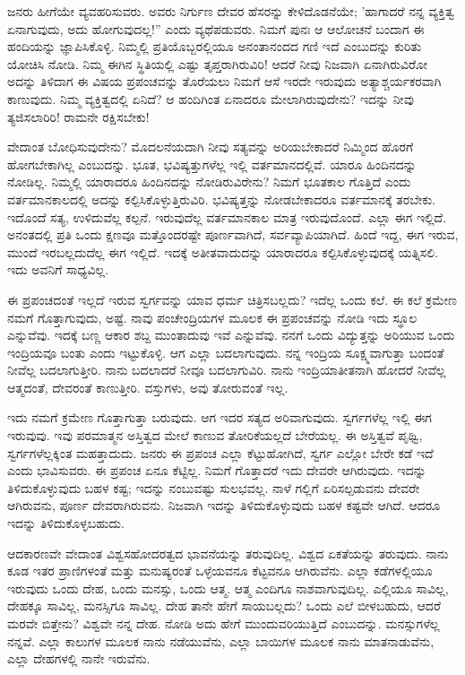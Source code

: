ಜನರು ಹೀಗೆಯೇ ವ್ಯವಹರಿಸುವರು. ಅವರು ನಿರ್ಗುಣ ದೇವರ ಹೆಸರನ್ನು ಕೇಳಿದೊಡನೆಯೇ; 'ಹಾಗಾದರೆ ನನ್ನ ವ್ಯಕ್ತಿತ್ವ ಏನಾಗುವುದು, ಅದು ಹೋಗುವುದಲ್ಲ!'' ಎಂದು ವ್ಯಥೆಪಡುವರು. ನಿಮಗೆ ಪುನಃ ಆ ಆಲೋಚನೆ ಬಂದಾಗ ಈ ಹಂದಿಯನ್ನು ಜ್ಞಾಪಿಸಿಕೊಳ್ಳಿ. ನಿಮ್ಮಲ್ಲಿ ಪ್ರತಿಯೊಬ್ಬರಲ್ಲಿಯೂ ಅನಂತಾನಂದದ ಗಣಿ ಇದೆ ಎಂಬುದನ್ನು ಕುರಿತು ಯೋಚಿಸಿ ನೋಡಿ. ನಿಮ್ಮ ಈಗಿನ ಸ್ಥಿತಿಯಲ್ಲಿ ಎಷ್ಟು ತೃಪ್ತರಾಗಿರುವಿರಿ! ಆದರೆ ನೀವು ನಿಜವಾಗಿ ಏನಾಗಿರುವಿರೋ ಅದನ್ನು ತಿಳಿದಾಗ ಈ ವಿಷಯ ಪ್ರಪಂಚವನ್ನು ತೊರೆಯಲು ನಿಮಗೆ ಆಸೆ ಇರದೇ ಇರುವುದು ಅತ್ಯಾಶ್ಚರ್ಯಕರವಾಗಿ ಕಾಣುವುದು. ನಿಮ್ಮ ವ್ಯಕ್ತಿತ್ವದಲ್ಲಿ ಏನಿದೆ? ಆ ಹಂದಿಗಿಂತ ಏನಾದರೂ ಮೇಲಾಗಿರುವುದೇನು? ಇದನ್ನು ನೀವು ತ್ಯಜಿಸಲಾರಿರಿ! ರಾಮನೇ ರಕ್ಷಿಸಬೇಕು!

ವೇದಾಂತ ಬೋಧಿಸುವುದೇನು? ಮೊದಲನೆಯದಾಗಿ ನೀವು ಸತ್ಯವನ್ನು ಅರಿಯಬೇಕಾದರೆ ನಿಮ್ಮಿಂದ ಹೊರಗೆ ಹೋಗಬೇಕಾಗಿಲ್ಲ ಎಂಬುದನ್ನು. ಭೂತ, ಭವಿಷ್ಯತ್ತುಗಳೆಲ್ಲ ಇಲ್ಲಿ ವರ್ತಮಾನದಲ್ಲಿವೆ. ಯಾರೂ ಹಿಂದಿನದನ್ನು ನೋಡಿಲ್ಲ. ನಿಮ್ಮಲ್ಲಿ ಯಾರಾದರೂ ಹಿಂದಿನದನ್ನು ನೋಡಿರುವಿರೇನು? ನಿಮಗೆ ಭೂತಕಾಲ ಗೊತ್ತಿದೆ ಎಂದು ವರ್ತಮಾನಕಾಲದಲ್ಲಿ ಅದನ್ನು ಕಲ್ಪಿಸಿಕೊಳ್ಳುತ್ತಿರುವಿರಿ. ಭವಿಷ್ಯತ್ತನ್ನು ನೋಡಬೇಕಾದರೂ ವರ್ತಮಾನಕ್ಕೆ ತರಬೇಕು. ಇದೊಂದೆ ಸತ್ಯ, ಉಳಿದುವೆಲ್ಲ ಕಲ್ಪನೆ. ಇರುವುದೆಲ್ಲ ವರ್ತಮಾನಕಾಲ ಮಾತ್ರ ಇರುವುದೊಂದೆ. ಎಲ್ಲಾ ಈಗ ಇಲ್ಲಿದೆ. ಅನಂತದಲ್ಲಿ ಪ್ರತಿ ಒಂದು ಕ್ಷಣವೂ ಮತ್ತೊಂದರಷ್ಟೇ ಪೂರ್ಣವಾಗಿದೆ, ಸರ್ವವ್ಯಾಪಿಯಾಗಿದೆ. ಹಿಂದೆ ಇದ್ದ, ಈಗ ಇರುವ, ಮುಂದೆ ಇರಬಲ್ಲದುದೆಲ್ಲ ಈಗ ಇಲ್ಲಿದೆ. ಇದಕ್ಕೆ ಅತೀತವಾದುದನ್ನು ಯಾರಾದರೂ ಕಲ್ಪಿಸಿಕೊಳ್ಳುವುದಕ್ಕೆ ಯತ್ನಿಸಲಿ. ಇದು ಅವನಿಗೆ ಸಾಧ್ಯವಿಲ್ಲ.

ಈ ಪ್ರಪಂಚದಂತೆ ಇಲ್ಲದೆ ಇರುವ ಸ್ವರ್ಗವನ್ನು ಯಾವ ಧರ್ಮ ಚಿತ್ರಿಸಬಲ್ಲದು? ಇದೆಲ್ಲ ಒಂದು ಕಲೆ. ಈ ಕಲೆ ಕ್ರಮೇಣ ನಮಗೆ ಗೊತ್ತಾಗುವುದು, ಅಷ್ಟೆ. ನಾವು ಪಂಚೇಂದ್ರಿಯಗಳ ಮೂಲಕ ಈ ಪ್ರಪಂಚವನ್ನು ನೋಡಿ ಇದು ಸ್ಥೂಲ ಎನ್ನುವೆವು. ಇದಕ್ಕೆ ಬಣ್ಣ ಆಕಾರ ಶಬ್ದ ಮುಂತಾದುವು ಇವೆ ಎನ್ನುವೆವು. ನನಗೆ ಒಂದು ವಿದ್ಯುತ್ತನ್ನು ಅರಿಯುವ ಒಂದು ಇಂದ್ರಿಯವೂ ಬಂತು ಎಂದು ಇಟ್ಟುಕೊಳ್ಳಿ. ಆಗ ಎಲ್ಲಾ ಬದಲಾಗುವುದು. ನನ್ನ ಇಂದ್ರಿಯ ಸೂಕ್ಷ್ಮವಾಗುತ್ತಾ ಬಂದಂತೆ ನೀವೆಲ್ಲ ಬದಲಾಗುತ್ತೀರಿ. ನಾನು ಬದಲಾದರೆ ನೀವೂ ಬದಲಾಗುವಿರಿ. ನಾನು ಇಂದ್ರಿಯಾತೀತನಾಗಿ ಹೋದರೆ ನೀವೆಲ್ಲ ಆತ್ಮದಂತೆ, ದೇವರಂತೆ ಕಾಣುತ್ತೀರಿ. ವಸ್ತುಗಳು, ಅವು ತೋರುವಂತೆ ಇಲ್ಲ.

ಇದು ನಮಗೆ ಕ್ರಮೇಣ ಗೊತ್ತಾಗುತ್ತಾ ಬರುವುದು. ಆಗ ಇದರ ಸತ್ಯದ ಅರಿವಾಗುವುದು. ಸ್ವರ್ಗಗಳೆಲ್ಲ ಇಲ್ಲಿ ಈಗ ಇರುವುವು. ಇವು ಪರಮಾತ್ಮನ ಅಸ್ತಿತ್ವದ ಮೇಲೆ ಕಾಣುವ ತೋರಿಕೆಯಲ್ಲದೆ ಬೇರೆಯಲ್ಲ. ಈ ಅಸ್ತಿತ್ವವೆ ಪೃಥ್ವಿ, ಸ್ವರ್ಗಗಳೆಲ್ಲಕ್ಕಿಂತ ಮಹತ್ತಾದುದು. ಜನರು ಈ ಪ್ರಪಂಚ ಎಲ್ಲಾ ಕೆಟ್ಟುಹೋಗಿದೆ, ಸ್ವರ್ಗ ಎಲ್ಲೋ ಬೇರೇ ಕಡೆ ಇದೆ ಎಂದು ಭಾವಿಸುವರು. ಈ ಪ್ರಪಂಚ ಏನೂ ಕೆಟ್ಟಿಲ್ಲ. ನಿಮಗೆ ಗೊತ್ತಾದರೆ ಇದು ದೇವರೇ ಆಗಿರುವುದು. ಇದನ್ನು ತಿಳಿದುಕೊಳ್ಳುವುದು ಬಹಳ ಕಷ್ಟ; ಇದನ್ನು ನಂಬುವಷ್ಟು ಸುಲಭವಲ್ಲ. ನಾಳೆ ಗಲ್ಲಿಗೆ ಏರಿಸಲ್ಪಡುವನು ದೇವರೇ ಆಗಿರುವನು, ಪೂರ್ಣ ದೇವರಾಗಿರುವನು. ನಿಜವಾಗಿ ಇದನ್ನು ತಿಳಿದುಕೊಳ್ಳುವುದು ಬಹಳ ಕಷ್ಟವೇ ಆಗಿದೆ. ಆದರೂ ಇದನ್ನು ತಿಳಿದುಕೊಳ್ಳಬಹುದು.

ಆದಕಾರಣವೇ ವೇದಾಂತ ವಿಶ್ವಸಹೋದರತ್ವದ ಭಾವನೆಯನ್ನು ತರುವುದಿಲ್ಲ. ವಿಶ್ವದ ಏಕತೆಯನ್ನು ತರುವುದು. ನಾನು ಕೂಡ ಇತರ ಪ್ರಾಣಿಗಳಂತೆ ಮತ್ತು ಮನುಷ್ಯರಂತೆ ಒಳ್ಳೆಯವನೂ ಕೆಟ್ಟವನೂ ಆಗಿರುವೆನು. ಎಲ್ಲಾ ಕಡೆಗಳಲ್ಲಿಯೂ ಇರುವುದು ಒಂದು ದೇಹ, ಒಂದು ಮನಸ್ಸು, ಒಂದು ಆತ್ಮ. ಆತ್ಮ ಎಂದಿಗೂ ನಾಶವಾಗುವುದಿಲ್ಲ. ಎಲ್ಲಿಯೂ ಸಾವಿಲ್ಲ, ದೇಹಕ್ಕೂ ಸಾವಿಲ್ಲ, ಮನಸ್ಸಿಗೂ ಸಾವಿಲ್ಲ. ದೇಹ ತಾನೇ ಹೇಗೆ ಸಾಯಬಲ್ಲದು? ಒಂದು ಎಲೆ ಬೀಳಬಹುದು, ಆದರೆ ಮರವೇ ಬಿತ್ತೇನು? ವಿಶ್ವವೇ ನನ್ನ ದೇಹ. ನೋಡಿ ಅದು ಹೇಗೆ ಮುಂದುವರಿಯುತ್ತಿದೆ ಎಂಬುದನ್ನು. ಮನಸ್ಸುಗಳೆಲ್ಲ ನನ್ನವೆ. ಎಲ್ಲಾ ಕಾಲುಗಳ ಮೂಲಕ ನಾನು ನಡೆಯುವೆನು, ಎಲ್ಲಾ ಬಾಯಿಗಳ ಮೂಲಕ ನಾನು ಮಾತನಾಡುವೆನು, ಎಲ್ಲಾ ದೇಹಗಳಲ್ಲಿ ನಾನೇ ಇರುವೆನು.

